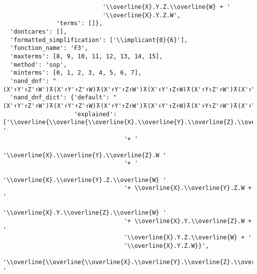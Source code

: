 \begin{verbatim}
                            '\\overline{X}.Y.Z.\\overline{W} + '
                            '\\overline{X}.Y.Z.W',
               'terms': []},
  'dontcares': [],
  'formatted_simplification': ['\\implicant{0}{6}'],
  'function_name': 'F3',
  'maxterms': [8, 9, 10, 11, 12, 13, 14, 15],
  'method': 'sop',
  'minterms': [0, 1, 2, 3, 4, 5, 6, 7],
  'nand_dnf': "(X'↑Y'↑Z'↑W')⊼(X'↑Y'↑Z'↑W)⊼(X'↑Y'↑Z↑W')⊼(X'↑Y'↑Z↑W)⊼(X'↑Y↑Z'↑W')⊼(X'↑Y↑Z'↑W)⊼(X'↑Y↑Z↑W')⊼(X'↑Y↑Z↑W)",
  'nand_dnf_dict': {'default': "(X'↑Y'↑Z'↑W')⊼(X'↑Y'↑Z'↑W)⊼(X'↑Y'↑Z↑W')⊼(X'↑Y'↑Z↑W)⊼(X'↑Y↑Z'↑W')⊼(X'↑Y↑Z'↑W)⊼(X'↑Y↑Z↑W')⊼(X'↑Y↑Z↑W)",
                    'explained': ['\\overline{\\overline{\\overline{X}.\\overline{Y}.\\overline{Z}.\\overline{W} '
                                  '+ '
                                  '\\overline{X}.\\overline{Y}.\\overline{Z}.W '
                                  '+ '
                                  '\\overline{X}.\\overline{Y}.Z.\\overline{W} '
                                  '+ \\overline{X}.\\overline{Y}.Z.W + '
                                  '\\overline{X}.Y.\\overline{Z}.\\overline{W} '
                                  '+ \\overline{X}.Y.\\overline{Z}.W + '
                                  '\\overline{X}.Y.Z.\\overline{W} + '
                                  '\\overline{X}.Y.Z.W}}',
                                  '\\overline{\\overline{\\overline{X}.\\overline{Y}.\\overline{Z}.\\overline{W} '

\end{verbatim}
